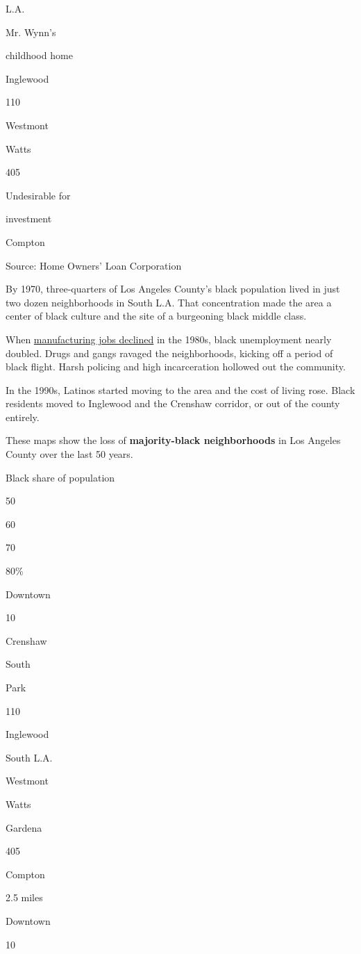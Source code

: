 L.A.

Mr. Wynn's

childhood home

Inglewood

110

Westmont

Watts

405

Undesirable for

investment

Compton

Source: Home Owners' Loan Corporation

By 1970, three-quarters of Los Angeles County's black population lived
in just two dozen neighborhoods in South L.A. That concentration made
the area a center of black culture and the site of a burgeoning black
middle class.

When
\href{https://www.labor.ucla.edu/wp-content/uploads/2017/03/UCLA_BWC_report_5-3_27-1.pdf}{manufacturing
jobs declined} in the 1980s, black unemployment nearly doubled. Drugs
and gangs ravaged the neighborhoods, kicking off a period of black
flight. Harsh policing and high incarceration hollowed out the
community.

In the 1990s, Latinos started moving to the area and the cost of living
rose. Black residents moved to Inglewood and the Crenshaw corridor, or
out of the county entirely.

These maps show the loss of \textbf{majority-black neighborhoods} in Los
Angeles County over the last 50 years.

Black share of population

50

60

70

80\%

Downtown

10

Crenshaw

South

Park

110

Inglewood

South L.A.

Westmont

Watts

Gardena

405

Compton

2.5 miles

Downtown

10

